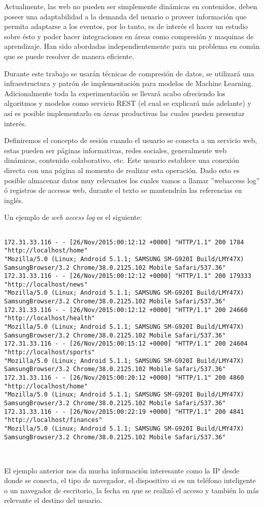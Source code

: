   Actualmente, las web no pueden ser simplemente dinámicas en contenidos, deben poseer una adaptabilidad a la demanda del usuario o proveer información que permita adaptarse a los eventos, por lo tanto, es de interés el hacer un estudio sobre ésto y poder hacer integraciones en áreas como compresión y maquinas de aprendizaje. Han sido abordadas independientemente para un problema en común que se puede resolver de manera eficiente. 

  Durante este trabajo se usarán técnicas de compresión de datos, se utilizará una infraestructura y patrón de implementación para modelos de Machine Learning. Adicionalmente toda la experimentación se llevará acabo ofreciendo los algoritmos y modelos como servicio REST (el cual se explicará más adelante) y así es posible implementarlo en áreas productivas las cuales pueden presentar interés.

  Definiremos el concepto de sesión cuando el usuario se conecta a un servicio web, estas pueden ser páginas informativas, redes sociales, generalmente web dinámicas, contenido colaborativo, etc. Este usuario establece una conexión directa con una página al momento de realizar esta operación. Dado esto es posible almacenar datos muy relevantes los cuales vamos a llamar ''webaccess log'' ó registros de accesos web, durante el texto se mantendrán las referencias en inglés.

  Un ejemplo de \emph{web access log} es el siguiente:


\begin{lstlisting}[frame=single,basicstyle=\ttfamily\tiny,]

172.31.33.116 - - [26/Nov/2015:00:12:12 +0000] "HTTP/1.1" 200 1784 "http://localhost/home" 
"Mozilla/5.0 (Linux; Android 5.1.1; SAMSUNG SM-G920I Build/LMY47X) 
SamsungBrowser/3.2 Chrome/38.0.2125.102 Mobile Safari/537.36"
172.31.33.116 - - [26/Nov/2015:00:12:12 +0000] "HTTP/1.1" 200 179333 "http://localhost/news" 
"Mozilla/5.0 (Linux; Android 5.1.1; SAMSUNG SM-G920I Build/LMY47X) 
SamsungBrowser/3.2 Chrome/38.0.2125.102 Mobile Safari/537.36"
172.31.33.116 - - [26/Nov/2015:00:12:12 +0000] "HTTP/1.1" 200 24660 "http://localhost/health" 
"Mozilla/5.0 (Linux; Android 5.1.1; SAMSUNG SM-G920I Build/LMY47X) 
SamsungBrowser/3.2 Chrome/38.0.2125.102 Mobile Safari/537.36"
172.31.33.116 - - [26/Nov/2015:00:15:12 +0000] "HTTP/1.1" 200 24604 "http://localhost/sports" 
"Mozilla/5.0 (Linux; Android 5.1.1; SAMSUNG SM-G920I Build/LMY47X) 
SamsungBrowser/3.2 Chrome/38.0.2125.102 Mobile Safari/537.36"
172.31.33.116 - - [26/Nov/2015:00:20:12 +0000] "HTTP/1.1" 200 4860 "http://localhost/home" 
"Mozilla/5.0 (Linux; Android 5.1.1; SAMSUNG SM-G920I Build/LMY47X) 
SamsungBrowser/3.2 Chrome/38.0.2125.102 Mobile Safari/537.36"
172.31.33.116 - - [26/Nov/2015:00:22:19 +0000] "HTTP/1.1" 200 4841 "http://localhost/finances" 
"Mozilla/5.0 (Linux; Android 5.1.1; SAMSUNG SM-G920I Build/LMY47X) 
SamsungBrowser/3.2 Chrome/38.0.2125.102 Mobile Safari/537.36"

  	
  \end{lstlisting}

  El ejemplo anterior nos da mucha información interesante como la IP desde donde se conecta, el tipo de navegador, el dispositivo si es un teléfono inteligente o un navegador de escritorio, la fecha en que se realizó el acceso y también lo más relevante el destino del usuario.
